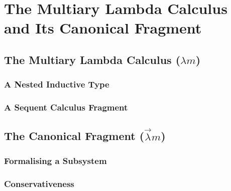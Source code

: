 \chapter{The Multiary Lambda Calculus and Its Canonical Fragment }
\label{c:multiary}

\section{The Multiary Lambda Calculus ($\lambda m$)}

\subsection{A Nested Inductive Type}

\subsection{A Sequent Calculus Fragment}

\section{The Canonical Fragment ($\vec \lambda m$)}

\subsection{Formalising a Subsystem}

\subsection{}

\subsection{Conservativeness}